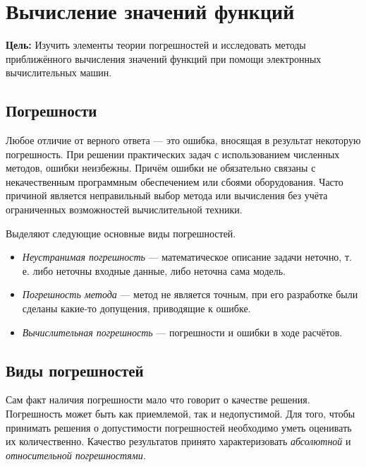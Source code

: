 \section{\noindent Вычисление значений функций}

\noindent \textbf{Цель:} Изучить элементы теории погрешностей и исследовать
методы приближённого вычисления значений функций при помощи электронных
вычислительных машин.

\medskip{}



\subsection{Погрешности}

Любое отличие от верного ответа — это ошибка, вносящая в результат
некоторую погрешность. При решении практических задач с использованием
численных методов, ошибки неизбежны. Причём ошибки не обязательно
связаны с некачественным программным обеспечением или сбоями оборудования.
Часто причиной является неправильный выбор метода или вычисления без
учёта ограниченных возможностей вычислительной техники.

Выделяют следующие основные виды погрешностей.
\begin{itemize}
\item \emph{Неустранимая погрешность} — математическое описание задачи неточно,
т. е. либо неточны входные данные, либо неточна сама модель.
\item \emph{Погрешность метода} — метод не является точным, при его разработке
были сделаны какие-то допущения, приводящие к ошибке.
\item \emph{Вычислительная погрешность} — погрешности и ошибки в ходе расчётов.
\end{itemize}

\subsection{Виды погрешностей}

Сам факт наличия погрешности мало что говорит о качестве решения.
Погрешность может быть как приемлемой, так и недопустимой. Для того,
чтобы принимать решения о допустимости погрешностей необходимо уметь
оценивать их количественно. Качество результатов принято характеризовать
\emph{абсолютной} и \emph{относительной погрешностями}.

